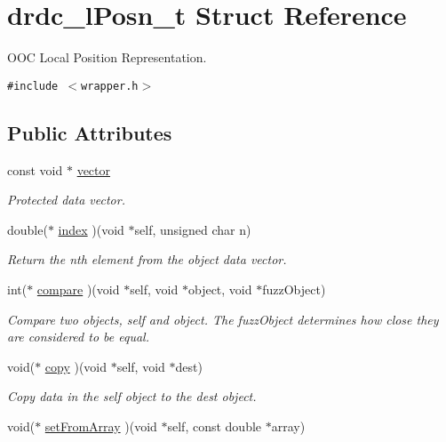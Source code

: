 \hypertarget{structdrdc__lPosn__t}{
\section{drdc\_\-lPosn\_\-t Struct Reference}
\label{structdrdc__lPosn__t}
}
OOC Local Position Representation.  


{\tt \#include $<$wrapper.h$>$}

\subsection*{Public Attributes}
\begin{CompactItemize}
\item 
const void $\ast$ \hyperlink{structdrdc__lPosn__t_2d9d257a1d0a8f872043d6cde860b819}{vector}
\begin{CompactList}\small\item\em Protected data vector. \item\end{CompactList}\item 
double($\ast$ \hyperlink{structdrdc__lPosn__t_4c1c722c6bcf89c94d0d79f912e6a8fc}{index} )(void $\ast$self, unsigned char n)
\begin{CompactList}\small\item\em Return the nth element from the object data vector. \item\end{CompactList}\item 
int($\ast$ \hyperlink{structdrdc__lPosn__t_c96fa0e4a4865314fe8eb3d084146ec2}{compare} )(void $\ast$self, void $\ast$object, void $\ast$fuzzObject)
\begin{CompactList}\small\item\em Compare two objects, self and object. The fuzzObject determines how close they are considered to be equal. \item\end{CompactList}\item 
void($\ast$ \hyperlink{structdrdc__lPosn__t_2bbf1f6e34cb3e050387f0c7564481d3}{copy} )(void $\ast$self, void $\ast$dest)
\begin{CompactList}\small\item\em Copy data in the self object to the dest object. \item\end{CompactList}\item 
void($\ast$ \hyperlink{structdrdc__lPosn__t_5381388dc9938ffd0d7be23e120ba160}{setFromArray} )(void $\ast$self, const double $\ast$array)

\end{CompactItemize}
